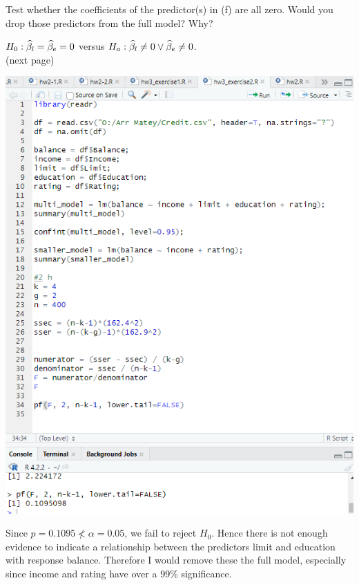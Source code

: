 Test whether the coefficients of the predictor(s) in (f) are all zero. Would you drop
those predictors from the full model? Why?

\soln* $H_0 : \widehat{\beta}_l = \widehat{\beta}_e = 0$ versus $H_a : \widehat{\beta}_l \neq 0 \lor \widehat{\beta}_e \neq 0$.
\\(next page)
\begin{center}
    \includegraphics[width=6in]{img/ex2h.PNG}
\end{center}

Since $p = 0.1095 \not < \alpha = 0.05$, we fail to reject $H_0$. Hence there is not enough evidence to indicate a relationship between the predictors limit and education with response balance. Therefore I would remove these the full model, especially since income and rating have over a 99\% significance. 